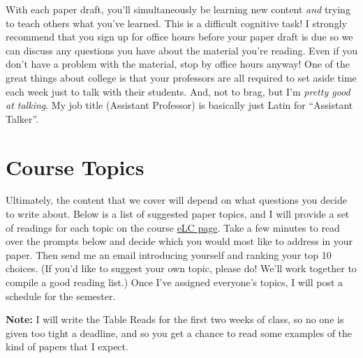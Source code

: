 \documentclass[11pt, letterpaper]{article}
\begin{document}
With each paper draft, you'll simultaneously be learning new content \textit{and} trying to teach others what you've learned. This is a difficult cognitive task! I strongly recommend that you sign up for office hours before your paper draft is due so we can discuss any questions you have about the material you're reading. Even if you don't have a problem with the material, stop by office hours anyway! One of the great things about college is that your professors are all required to set aside time each week just to talk with their students. And, not to brag, but I'm \textit{pretty good at talking}. My job title (Assistant Professor) is basically just Latin for ``Assistant Talker''.

\section*{Course Topics}

Ultimately, the content that we cover will depend on what questions you decide to write about. Below is a list of suggested paper topics, and I will provide a set of readings for each topic on the course \href{https://uga.view.usg.edu/d2l/home/2213495}{eLC page}. Take a few minutes to read over the prompts below and decide which you would most like to address in your paper. Then send me an email introducing yourself and ranking your top 10 choices. (If you'd like to suggest your own topic, please do! We'll work together to compile a good reading list.) Once I've assigned everyone's topics, I will post a schedule for the semester.

\textbf{Note:} I will write the Table Reads for the first two weeks of class, so no one is given too tight a deadline, and so you get a chance to read some examples of the kind of papers that I expect.

%
%
%
\end{document}
